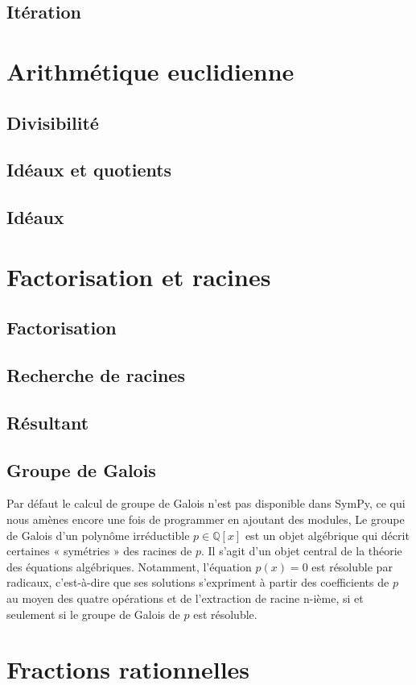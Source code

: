  \subsection{Itération}
 \section{Arithmétique euclidienne}
 \subsection{ Divisibilité}
 \subsection{ Idéaux et quotients}
 \subsection{Idéaux}
 \section{ Factorisation et racines}
 \subsection{Factorisation}
 \subsection{ Recherche de racines}
 \subsection{ Résultant}
 \subsection{ Groupe de Galois}
 Par défaut le calcul de groupe de Galois n'est pas disponible dans SymPy, ce qui nous amènes encore
 une fois de programmer en ajoutant des modules, Le groupe de Galois d’un polynôme irréductible $p \in \mathbb{Q}\left[x\right]$ est un objet algébrique qui décrit certaines « symétries » des racines de $p$. Il s’agit d’un objet central de la théorie des équations algébriques. Notamment, l’équation $p\left(x\right) = 0$
est résoluble par radicaux, c’est-à-dire que ses solutions s’expriment à partir des coefficients de $p$ au moyen des quatre opérations et de l'extraction de racine n-ième, si et seulement si le groupe de Galois de $p$ est résoluble.
\section{ Fractions rationnelles}
